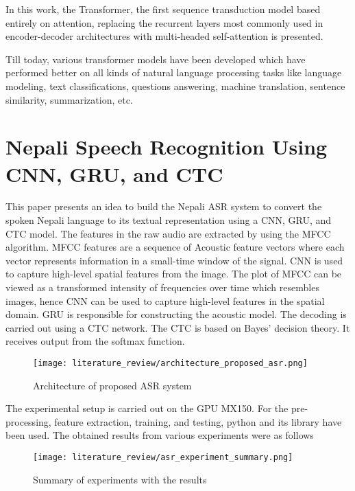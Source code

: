 In this work, the Transformer, the first sequence transduction model based entirely on attention, replacing the recurrent layers most commonly used in encoder-decoder architectures with multi-headed self-attention is presented.

Till today, various transformer models have been developed which have performed better on all kinds of natural language processing tasks like language modeling, text classifications, questions answering, machine translation, sentence similarity, summarization, etc.


\section{Nepali Speech Recognition Using CNN, GRU, and CTC}
This paper presents an idea to build the Nepali ASR system to convert the spoken Nepali language to its textual representation using a CNN, GRU, and CTC model. The features in the raw audio are extracted by using the MFCC algorithm. MFCC features are a sequence of Acoustic feature vectors where each vector represents information in a small-time window of the signal. CNN is used to capture high-level spatial features from the image. The plot of MFCC can be viewed as a transformed intensity of frequencies over time which resembles images, hence CNN can be used to capture high-level features in the spatial domain. GRU is responsible for constructing the acoustic model. The decoding is carried out using a CTC network. The CTC is based on Bayes’ decision theory. It receives output from the softmax function. 


\begin{figure}[H]
    \centering
    \texttt{[image: literature\_review/architecture\_proposed\_asr.png]}
    \caption{Architecture of proposed ASR system}
    \label{fig:Architecture of proposed ASR system}
\end{figure}

The experimental setup is carried out on the GPU MX150. For the pre-processing, feature extraction, training, and testing, python and its library have been used. The obtained results from various experiments were as follows

\begin{figure}[H]
    \centering
    \texttt{[image: literature\_review/asr\_experiment\_summary.png]}
    \caption{Summary of experiments with the results}
    \label{fig:Summary of experiments with the results}
\end{figure}

